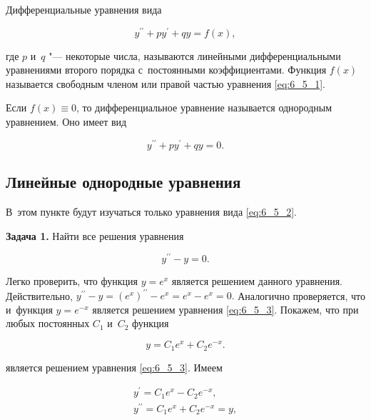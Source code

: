 
Дифференциальные уравнения вида

\begin{equation}\label{eq:6_5_1}
y^{\prime\prime} + py^\prime + qy = f(x),
\end{equation}

\noindent
где $p$ и~$q$ "--- некоторые числа, называются линейными дифференциальными уравнениями
второго порядка с~постоянными коэффициентами. Функция $f(x)$ называется свободным членом
или правой частью уравнения \eqref{eq:6_5_1}.

Если $f(x) \equiv 0$, то дифференциальное уравнение называется однородным уравнением.
Оно имеет вид

\begin{equation}\label{eq:6_5_2}
y^{\prime\prime} + py^\prime + qy = 0.
\end{equation}

\subsection{Линейные однородные уравнения}
В~этом пункте будут изучаться только уравнения вида \eqref{eq:6_5_2}.

\textbf{Задача 1.}\label{ex:6_5_1} Найти все решения уравнения

\begin{equation}\label{eq:6_5_3}
y^{\prime\prime} - y = 0.
\end{equation}

Легко проверить, что функция $y = e^{x}$ является решением данного уравнения.
Действительно,
$y^{\prime\prime} - y = 
\left( e^{x} \right)^{\prime\prime} - e^{x} = 
e^{x} - e^{x} = 0.$
Аналогично проверяется, что и~функция $y = e^{-x}$ является решением уравнения \eqref{eq:6_5_3}.
Покажем, что при любых постоянных $C_{1}$ и~$C_{2}$ функция

\begin{equation}\label{eq:6_5_4}
y = C_{1}e^{x} + C_{2}e^{-x}.
\end{equation}

\noindent
является решением уравнения \eqref{eq:6_5_3}. Имеем

\begin{gather*}
y^\prime = C_{1}e^{x} - C_{2}e^{-x}, \\
y^{\prime\prime} = C_{1}e^{x} + C_{2}e^{-x} = y,
\end{gather*}

